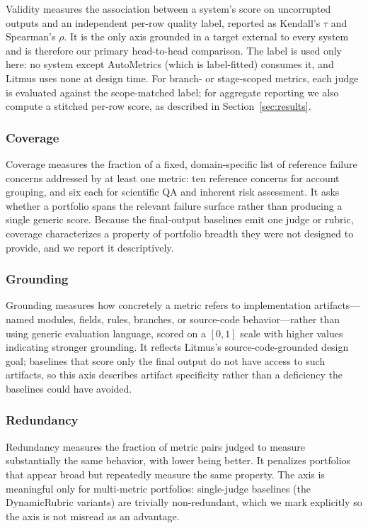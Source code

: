 \documentclass[11pt]{article}
\begin{document}
Validity measures the association between a system's score on uncorrupted outputs and an independent per-row quality label, reported as Kendall's $\tau$ and Spearman's $\rho$. It is the only axis grounded in a target external to every system and is therefore our primary head-to-head comparison. The label is used only here: no system except AutoMetrics (which is label-fitted) consumes it, and Litmus uses none at design time. For branch- or stage-scoped metrics, each judge is evaluated against the scope-matched label; for aggregate reporting we also compute a stitched per-row score, as described in Section~\ref{sec:results}.

\subsubsection{Coverage}

Coverage measures the fraction of a fixed, domain-specific list of reference failure concerns addressed by at least one metric: ten reference concerns for account grouping, and six each for scientific QA and inherent risk assessment. It asks whether a portfolio spans the relevant failure surface rather than producing a single generic score. Because the final-output baselines emit one judge or rubric, coverage characterizes a property of portfolio breadth they were not designed to provide, and we report it descriptively.

\subsubsection{Grounding}

Grounding measures how concretely a metric refers to implementation artifacts---named modules, fields, rules, branches, or source-code behavior---rather than using generic evaluation language, scored on a $[0,1]$ scale with higher values indicating stronger grounding. It reflects Litmus's source-code-grounded design goal; baselines that score only the final output do not have access to such artifacts, so this axis describes artifact specificity rather than a deficiency the baselines could have avoided.

\subsubsection{Redundancy}

Redundancy measures the fraction of metric pairs judged to measure substantially the same behavior, with lower being better. It penalizes portfolios that appear broad but repeatedly measure the same property. The axis is meaningful only for multi-metric portfolios: single-judge baselines (the DynamicRubric variants) are trivially non-redundant, which we mark explicitly so the axis is not misread as an advantage.
\end{document}
